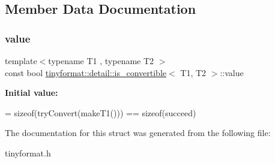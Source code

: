 \subsection{Member Data Documentation}
\mbox{\label{structtinyformat_1_1detail_1_1is__convertible_a399ca4333bd68f88a5d5a2430f804df2}} 
\subsubsection{\texorpdfstring{value}{value}}
{\footnotesize\ttfamily template$<$typename T1 , typename T2 $>$ \\
const bool \mbox{\hyperlink{structtinyformat_1_1detail_1_1is__convertible}{tinyformat\+::detail\+::is\+\_\+convertible}}$<$ T1, T2 $>$\+::value\hspace{0.3cm}{\ttfamily [static]}}

{\bfseries Initial value\+:}
\begin{DoxyCode}
=
            \textcolor{keyword}{sizeof}(tryConvert(makeT1())) == \textcolor{keyword}{sizeof}(succeed)
\end{DoxyCode}


The documentation for this struct was generated from the following file\+:\begin{DoxyCompactItemize}
\item 
tinyformat.\+h\end{DoxyCompactItemize}
